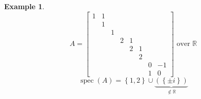 \documentclass{article}
\newtheorem{example}{Example}  \numberwithin{example}{section}
\newcommand{\set}[1]{\left\{#1\right\}}
\begin{document}
\begin{example} %
  \[
    A = \begin{bmatrix}
      1 & 1 &   &   &   &   &   & \\
        & 1 &   &   &   &   &   & \\
        &   & 1 &   &   &   &   & \\
        &   &   & 2 & 1 &   &   & \\
        &   &   &   & 2 & 1 &   & \\
        &   &   &   &   & 2 &   & \\
        &   &   &   &   &   & 0 & -1 \\
        &   &   &   &   &   & 1 & 0
    \end{bmatrix}
    \text{ over $\mathbb R$}
  \]
  \[ \operatorname{spec}(A) = \set{1,2} \cup \underbrace{(\set{\pm i})}_{\not\in \mathbb R} \]


\end{example}
\end{document}
